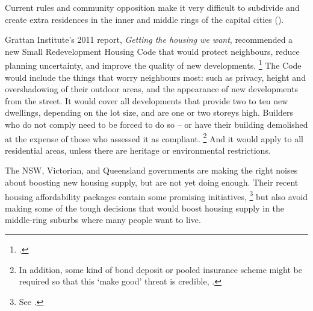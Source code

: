 Current rules and community opposition make it very difficult to subdivide and create extra residences in the inner and middle rings of the capital cities ().

Grattan Institute's 2011 report, \emph{Getting the housing we want}, recommended a new Small Redevelopment Housing Code that would protect neighbours, reduce planning uncertainty, and improve the quality of new developments.%
	\footcite[][26--27]{KellyBreadonReichl2011}
The Code would include the things that worry neighbours most: such as privacy, height and overshadowing of their outdoor areas, and the appearance of new developments from the street.
It would cover all developments that provide two to ten new dwellings, depending on the lot size, and are one or two storeys high.
Builders who do not comply need to be forced to do so -- or have their building demolished at the expense of those who assessed it as compliant.%
	\footnote{In addition, some kind of bond deposit or pooled insurance scheme might be required so that this `make good' threat is credible, \textcite[][230]{CommissionMigrantIntake2016}.}
And it would apply to all residential areas, unless there are heritage or environmental restrictions.

The NSW, Victorian, and Queensland governments are making the right noises about boosting new housing supply, but are not yet doing enough.
Their recent housing affordability packages contain some promising initiatives,%
    \footnote{See .}
but also avoid making some of the tough decisions that would boost housing supply in the middle-ring suburbs where many people want to live.

